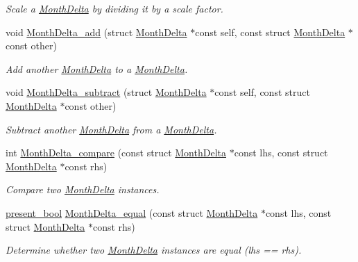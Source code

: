 \begin{DoxyCompactItemize}
\begin{DoxyCompactList}\small\item\em \-Scale a \hyperlink{structMonthDelta}{\-Month\-Delta} by dividing it by a scale factor. \end{DoxyCompactList}\item 
void \hyperlink{month-delta_8h_abfad34a14bf54d199a2f87eaef326cd7}{\-Month\-Delta\-\_\-add} (struct \hyperlink{structMonthDelta}{\-Month\-Delta} $\ast$const self, const struct \hyperlink{structMonthDelta}{\-Month\-Delta} $\ast$const other)
\begin{DoxyCompactList}\small\item\em \-Add another \hyperlink{structMonthDelta}{\-Month\-Delta} to a \hyperlink{structMonthDelta}{\-Month\-Delta}. \end{DoxyCompactList}\item 
void \hyperlink{month-delta_8h_a1f28431851a8b020b8a325cfbfbfdb44}{\-Month\-Delta\-\_\-subtract} (struct \hyperlink{structMonthDelta}{\-Month\-Delta} $\ast$const self, const struct \hyperlink{structMonthDelta}{\-Month\-Delta} $\ast$const other)
\begin{DoxyCompactList}\small\item\em \-Subtract another \hyperlink{structMonthDelta}{\-Month\-Delta} from a \hyperlink{structMonthDelta}{\-Month\-Delta}. \end{DoxyCompactList}\item 
int \hyperlink{month-delta_8h_a1428161f8576c24beb2208127abd890e}{\-Month\-Delta\-\_\-compare} (const struct \hyperlink{structMonthDelta}{\-Month\-Delta} $\ast$const lhs, const struct \hyperlink{structMonthDelta}{\-Month\-Delta} $\ast$const rhs)
\begin{DoxyCompactList}\small\item\em \-Compare two \hyperlink{structMonthDelta}{\-Month\-Delta} instances. \end{DoxyCompactList}\item 
\hyperlink{types_8h_a1c24e2cdd988b886e889080ded176ae0}{present\-\_\-bool} \hyperlink{month-delta_8h_a91491c8d411b52dee3ecd6bcf0b3f097}{\-Month\-Delta\-\_\-equal} (const struct \hyperlink{structMonthDelta}{\-Month\-Delta} $\ast$const lhs, const struct \hyperlink{structMonthDelta}{\-Month\-Delta} $\ast$const rhs)
\begin{DoxyCompactList}\small\item\em \-Determine whether two \hyperlink{structMonthDelta}{\-Month\-Delta} instances are equal (lhs == rhs). \end{DoxyCompactList}\item 

\end{DoxyCompactItemize}
